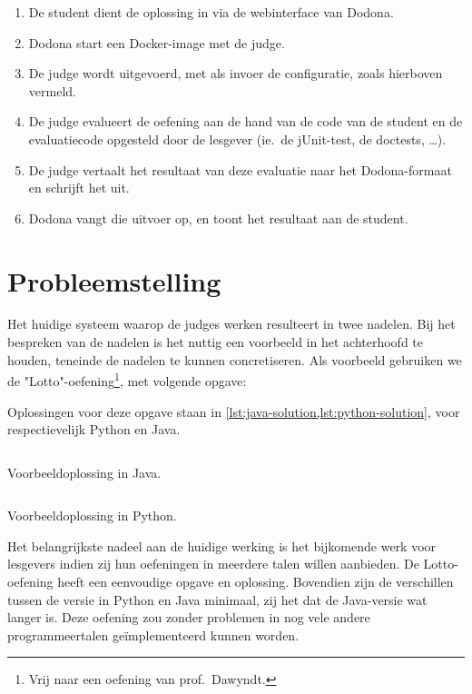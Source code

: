 \begin{enumerate}
    \item De student dient de oplossing in via de webinterface van Dodona.
    \item Dodona start een Docker-image met de judge.
    \item De judge wordt uitgevoerd, met als invoer de configuratie, zoals hierboven vermeld.
    \item De judge evalueert de oefening aan de hand van de code van de student en de evaluatiecode opgesteld door de lesgever (ie.\ de jUnit-test, de doctests, \ldots).
    \item De judge vertaalt het resultaat van deze evaluatie naar het Dodona-formaat en schrijft het uit.
    \item Dodona vangt die uitvoer op, en toont het resultaat aan de student.
\end{enumerate}

\section{Probleemstelling}\label{sec:probleemstelling}

Het huidige systeem waarop de judges werken resulteert in twee nadelen.
Bij het bespreken van de nadelen is het nuttig een voorbeeld in het achterhoofd te houden, teneinde de nadelen te kunnen concretiseren.
Als voorbeeld gebruiken we de "Lotto"-oefening\footnote{Vrij naar een oefening van prof.\ Dawyndt.}, met volgende opgave:

\begin{quotation}
\end{quotation}

Oplossingen voor deze opgave staan in \cref{lst:java-solution,lst:python-solution}, voor respectievelijk Python en Java.

\begin{listing}
    \inputminted{java}{code/correct-solution.java}
    \caption{Voorbeeldoplossing in Java.}
    \label{lst:java-solution}
\end{listing}

\begin{listing}
    \inputminted{python3}{code/correct-solution.py}
    \caption{Voorbeeldoplossing in Python.}
    \label{lst:python-solution}
\end{listing}

Het belangrijkste nadeel aan de huidige werking is het bijkomende werk voor lesgevers indien zij hun oefeningen in meerdere talen willen aanbieden.
De Lotto-oefening heeft een eenvoudige opgave en oplossing.
Bovendien zijn de verschillen tussen de versie in Python en Java minimaal, zij het dat de Java-versie wat langer is.
Deze oefening zou zonder problemen in nog vele andere programmeertalen geïmplementeerd kunnen worden.

